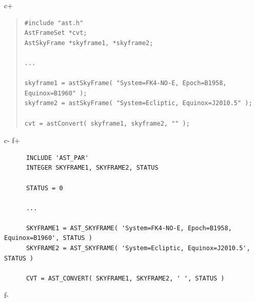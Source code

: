 \documentclass[twoside,11pt]{article}
\begin{document}
c+
\begin{quote}
\small
\begin{verbatim}
#include "ast.h"
AstFrameSet *cvt;
AstSkyFrame *skyframe1, *skyframe2;

...

skyframe1 = astSkyFrame( "System=FK4-NO-E, Epoch=B1958, Equinox=B1960" );
skyframe2 = astSkyFrame( "System=Ecliptic, Equinox=J2010.5" );

cvt = astConvert( skyframe1, skyframe2, "" );
\end{verbatim}
\normalsize
\end{quote}
c-
f+
\small
\begin{verbatim}
      INCLUDE 'AST_PAR'
      INTEGER SKYFRAME1, SKYFRAME2, STATUS

      STATUS = 0

      ...

      SKYFRAME1 = AST_SKYFRAME( 'System=FK4-NO-E, Epoch=B1958, Equinox=B1960', STATUS )
      SKYFRAME2 = AST_SKYFRAME( 'System=Ecliptic, Equinox=J2010.5', STATUS )

      CVT = AST_CONVERT( SKYFRAME1, SKYFRAME2, ' ', STATUS )
\end{verbatim}
\normalsize
f-
\end{document}
